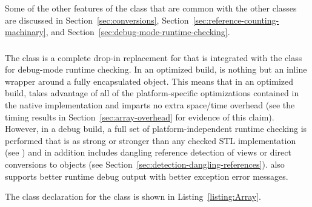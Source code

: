 \documentclass[pdf,ps2pdf,11pt]{SANDreport}
\begin{document}
Some of the other features of the {} class that are
common with the other classes are discussed in
Section~\ref{sec:conversions},
Section~\ref{sec:reference-counting-machinary}, and
Section~\ref{sec:debug-mode-runtime-checking}.


%
{}\subsubsection{}
\label{sec:Array}
%

The class {} is a complete drop-in replacement for
{} that is integrated with the {}
class for debug-mode runtime checking.  In an optimized build,
{} is nothing but an inline wrapper around a fully
encapsulated {} object.  This means that in an
optimized build, {} takes advantage of all of the
platform-specific optimizations contained in the native
{} implementation and imparts no extra space/time
overhead (see the timing results in Section~\ref{sec:array-overhead}
for evidence of this claim).  However, in a debug build, a full set of
platform-independent runtime checking is performed that is as strong
or stronger than any checked STL implementation (see {}\cite[Item
{}83]{C++CodingStandards05}) and in addition includes dangling
reference detection of {} views or direct conversions
to {} objects (see
Section~\ref{sec:detection-dangling-references}).  {} also
supports better runtime debug output with better exception error
messages.

The class declaration for the {} class is shown in
Listing~\ref{listing:Array}.
\end{document}
